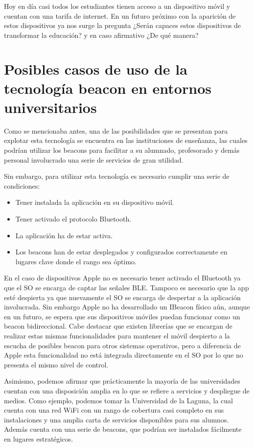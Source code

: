 Hoy en día casi todos los estudiantes tienen acceso a un dispositivo móvil y cuentan con una tarifa de internet. En un futuro próximo con la aparición de estos dispositivos ya nos surge la pregunta ¿Serán capaces estos dispositivos de transformar la educación? y en caso afirmativo ¿De qué manera? 

\section {Posibles casos de uso de la tecnología beacon en entornos universitarios}

Como se mencionaba antes, una de las posibilidades que se presentan para explotar esta tecnología se encuentra en las instituciones de enseñanza, las cuales podrían utilizar los beacons para facilitar a su alumnado, profesorado y demás personal involucrado  una serie de servicios de gran utilidad.


Sin embargo, para utilizar esta tecnología es necesario cumplir una serie de condiciones:

\begin{itemize}
\item Tener instalada la aplicación en su dispositivo móvil.
\item Tener activado el protocolo Bluetooth.
\item La aplicación ha de estar activa.
\item Los beacons han de estar desplegados y configurados correctamente en lugares clave donde el rango sea óptimo.
\end{itemize}

En el caso de dispositivos Apple no es necesario tener activado el Bluetooth ya que el SO se encarga de captar las señales BLE. Tampoco es necesario que la app esté despierta ya que nuevamente el SO se encarga de despertar a la aplicación involucrada. Sin embargo Apple no ha desarrollado un IBeacon físico aún, aunque en un futuro, se espera que sus dispositivos móviles puedan funcionar como un beacon bidireccional. Cabe destacar que existen librerías que se encargan de realizar estas mismas funcionalidades para mantener el móvil despierto a la escucha de posibles beacon para otros sistemas operativos, pero a diferencia de Apple esta funcionalidad no está integrada directamente en el SO por lo que no presenta el mismo nivel de control.


Asimismo, podemos afirmar que prácticamente la mayoría de las universidades cuentan con una disposición amplia en lo que se refiere a servicios y despliegue de medios. Como ejemplo, podemos tomar la Universidad de la Laguna, la cual cuenta con una red WiFi con un rango de cobertura casi completo en sus instalaciones y una amplia carta de servicios disponibles para sus alumnos. Además cuenta con una serie de beacons, que podrían ser instalados fácilmente en lugares estratégicos. 


